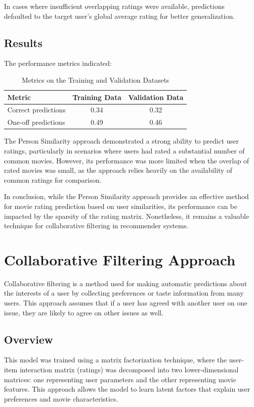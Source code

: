 \documentclass[a4paper,9pt]{article}
\begin{document}
In cases where insufficient overlapping ratings were available, predictions defaulted to the target user's global average rating for better generalization.

\subsection{Results}
The performance metrics indicated:

\begin{table}[ht]
	\centering
	\begin{tabular}{|l|c|c|}
		\hline
		\textbf{Metric}     & \textbf{Training Data} & \textbf{Validation Data} \\ \hline
		Correct predictions & 0.34                   & 0.32                     \\ \hline
		One-off predictions & 0.49                   & 0.46                     \\ \hline
	\end{tabular}
	\caption{Metrics on the Training and Validation Datasets}
	\label{tab:person_similarity_results}
\end{table}

The Person Similarity approach demonstrated a strong ability to predict user ratings,
particularly in scenarios where users had rated a substantial number of common movies.
However, its performance was more limited when the overlap of rated movies was small, as the approach relies heavily
on the availability of common ratings for comparison.

In conclusion, while the Person Similarity approach provides an effective method for movie rating prediction based on user
similarities, its performance can be impacted by the sparsity of the rating matrix.
Nonetheless, it remains a valuable technique for collaborative filtering in recommender systems.

\clearpage
\section{Collaborative Filtering Approach}
Collaborative filtering is a method used for making automatic predictions about the interests of a user by collecting preferences or taste information from many users. This approach assumes that if a user has agreed with another user on one issue, they are likely to agree on other issues as well.

\subsection{Overview}
This model was trained using a matrix factorization technique, where the user-item interaction matrix (ratings) was decomposed into two lower-dimensional matrices: one representing user parameters and the other representing movie features. This approach allows the model to learn latent factors that explain user preferences and movie characteristics.
\end{document}
